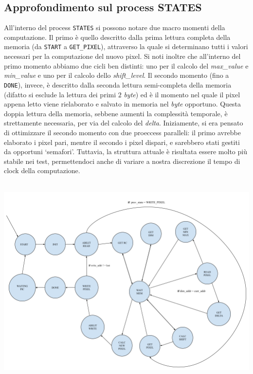 \documentclass[11pt, a4paper]{article}
\begin{document}
\subsection{Approfondimento sul process STATES}
All'interno del process \texttt{STATES} si possono notare due macro momenti della computazione. Il primo è quello descritto dalla prima lettura completa della memoria (da \texttt{START} a \texttt{GET\_PIXEL}), attraverso la quale si determinano tutti i valori necessari per la computazione del nuovo pixel. Si noti inoltre che all'interno del primo momento abbiamo due cicli ben distinti: uno per il calcolo del \textit{max\_value} e \textit{min\_value} e uno per il calcolo dello \textit{shift\_level}. Il secondo momento (fino a \texttt{DONE}), invece, è descritto dalla seconda lettura semi-completa della memoria (difatto si esclude la lettura dei primi $2$ \textit{byte}) ed è il momento nel quale il pixel appena letto viene rielaborato e salvato in memoria nel \textit{byte} opportuno. Questa doppia lettura della memoria, sebbene aumenti la complessità temporale, è strettamente necessaria, per via del calcolo del \textit{delta}. Iniziamente, si era pensato di ottimizzare il secondo momento con due proeccess paralleli: il primo avrebbe elaborato i pixel pari, mentre il secondo i pixel dispari, e sarebbero stati gestiti da opportuni `semafori'. Tuttavia, la struttura attuale è risultata essere molto più stabile nei test, permettendoci anche di variare a nostra discrezione il tempo di clock della computazione.
\includegraphics[width=16cm, height=11.5cm]{FSM.png}
\end{document}
